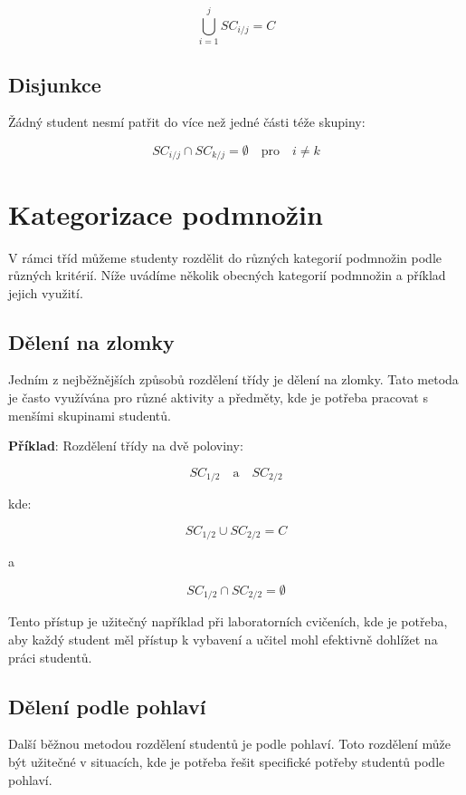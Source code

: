 \[
\bigcup_{i=1}^{j} SC_{i/j} = C
\]

\subsection*{Disjunkce}

Žádný student nesmí patřit do více než jedné části téže skupiny:

\[
SC_{i/j} \cap SC_{k/j} = \emptyset \quad \text{pro} \quad i \neq k
\]

\section{Kategorizace podmnožin}

V rámci tříd můžeme studenty rozdělit do různých kategorií podmnožin podle různých kritérií. Níže uvádíme několik obecných kategorií podmnožin a příklad jejich využití.

\subsection*{Dělení na zlomky}

Jedním z nejběžnějších způsobů rozdělení třídy je dělení na zlomky. Tato metoda je často využívána pro různé aktivity a předměty, kde je potřeba pracovat s menšími skupinami studentů.

\setlength{\parindent}{0em}
\setlength{\parskip}{1em}
\textbf{Příklad}: Rozdělení třídy na dvě poloviny:

\[
SC_{1/2} \quad \text{a} \quad SC_{2/2}
\]

kde:

\[
SC_{1/2} \cup SC_{2/2} = C
\]

a

\[
SC_{1/2} \cap SC_{2/2} = \emptyset
\]

Tento přístup je užitečný například při laboratorních cvičeních, kde je potřeba, aby každý student měl přístup k vybavení a učitel mohl efektivně dohlížet na práci studentů.

\subsection*{Dělení podle pohlaví}

Další běžnou metodou rozdělení studentů je podle pohlaví. Toto rozdělení může být užitečné v situacích, kde je potřeba řešit specifické potřeby studentů podle pohlaví.


